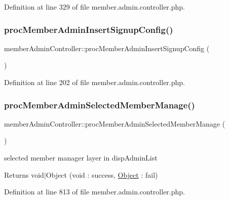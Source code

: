 Definition at line 329 of file member.\+admin.\+controller.\+php.

\hypertarget{classmemberAdminController_a9e134d115f4fa383b20ec2b7c8cae444}{}\label{classmemberAdminController_a9e134d115f4fa383b20ec2b7c8cae444} 
\subsubsection{\texorpdfstring{proc\+Member\+Admin\+Insert\+Signup\+Config()}{procMemberAdminInsertSignupConfig()}}
{\footnotesize\ttfamily member\+Admin\+Controller\+::proc\+Member\+Admin\+Insert\+Signup\+Config (\begin{DoxyParamCaption}{ }\end{DoxyParamCaption})}



Definition at line 202 of file member.\+admin.\+controller.\+php.

\hypertarget{classmemberAdminController_ab80e03747fc4079068d0ed6a086fbd8f}{}\label{classmemberAdminController_ab80e03747fc4079068d0ed6a086fbd8f} 
\subsubsection{\texorpdfstring{proc\+Member\+Admin\+Selected\+Member\+Manage()}{procMemberAdminSelectedMemberManage()}}
{\footnotesize\ttfamily member\+Admin\+Controller\+::proc\+Member\+Admin\+Selected\+Member\+Manage (\begin{DoxyParamCaption}{ }\end{DoxyParamCaption})}

selected member manager layer in disp\+Admin\+List \begin{DoxyReturn}{Returns}
void$\vert$\+Object (void \+: success, \hyperlink{classObject}{Object} \+: fail) 
\end{DoxyReturn}


Definition at line 813 of file member.\+admin.\+controller.\+php.

